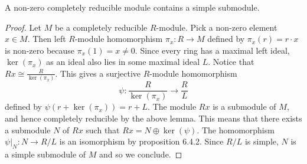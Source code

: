 \documentclass[a4paper]{article}
\begin{document}
\begin{lmm}{}{} A non-zero completely reducible module contains a simple submodule. \tcbline
\begin{proof}
Let $M$ be a completely reducible $R$-module. Pick a non-zero element $x\in M$. Then left $R$-module homomorphism $\pi_x:R\to M$ defined by $\pi_x(r)=r\cdot x$ is non-zero because $\pi_x(1)=x\neq 0$. Since every ring has a maximal left ideal, $\ker(\pi_x)$ as an ideal also lies in some maximal ideal $L$. Notice that $Rx\cong\frac{R}{\ker(\pi_x)}$. This gives a surjective $R$-module homomorphism $$\psi:\frac{R}{\ker(\pi_x)}\to\frac{R}{L}$$ defined by $\psi(r+\ker(\pi_x))=r+L$. The module $Rx$ is a submodule of $M$, and hence completely reducible by the above lemma. This means that there exists a submodule $N$ of $Rx$ such that $Rx=N\oplus\ker(\psi)$. The homomorphism $\psi|_N:N\to R/L$ is an isomorphism by proposition 6.4.2. Since $R/L$ is simple, $N$ is a simple submodule of $M$ and so we conclude. 
\end{proof}
\end{lmm}
\end{document}
